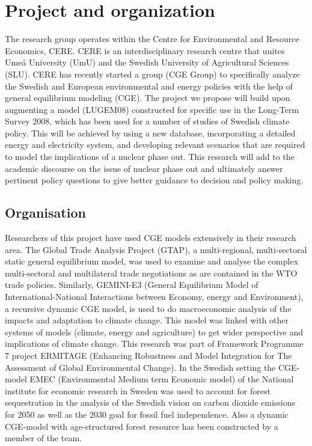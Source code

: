 \section{Project and organization}
The research group operates within the Centre for Environmental and Resource Economics, CERE. CERE is an interdisciplinary research centre that unites Umeå University (UmU) and the Swedish University of Agricultural Sciences (SLU). CERE has recently started a group (CGE Group) to specifically analyze the Swedish and European environmental and energy policies with the help of general equilibrium modeling (CGE). The project we propose will build upon augmenting a model (LUGEM08) constructed for specific use in the Long-Term Survey 2008, which has been used for a number of studies of Swedish climate policy. This will be achieved by using a new database, incorporating a detailed energy and electricity system, and developing relevant scenarios that are required to model the implications of a nuclear phase out. This research will add to the academic discourse on the issue of nuclear phase out and ultimately answer pertinent policy questions to give better guidance to decision and policy making.

\subsection{Organisation}
Researchers of this project have used CGE models extensively in their research area. The Global Trade Analysis Project (GTAP), a multi-regional, multi-sectoral static general equilibrium model, was used to examine and analyse the complex multi-sectoral and multilateral trade negotiations as are contained in the WTO trade policies. Similarly, GEMINI-E3 (General Equilibrium Model of International-National Interactions between Economy, energy and Environment), a recursive dynamic CGE model, is used to do macroeconomic analysis of the impacts and adaptation to climate change. This model was linked with other systems of models (climate, energy and agriculture) to get wider perspective and implications of climate change. This research was part of Framework Programme 7 project ERMITAGE (Enhancing Robustness and Model Integration for The Assessment of Global Environmental Change). In the Swedish setting the CGE-model EMEC (Environmental Medium term Economic model) of the National institute for economic research in Sweden was used to account for forest sequestration in the analysis of the Swedish vision on carbon dioxide emissions for 2050 as well as the 2030 goal for fossil fuel independence. Also a dynamic CGE-model with age-structured forest resource \citep{furtenback2011three} has been constructed by a member of the team.

